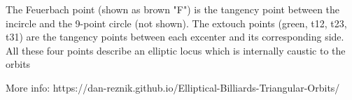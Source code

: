 The Feuerbach point (shown as brown "F") is the tangency point between the incircle and the 9-point circle (not shown). The extouch points (green, t12, t23, t31) are the tangency points between each excenter and its corresponding side. All these four points describe an elliptic locus which is internally caustic to the orbits

More info: https://dan-reznik.github.io/Elliptical-Billiards-Triangular-Orbits/